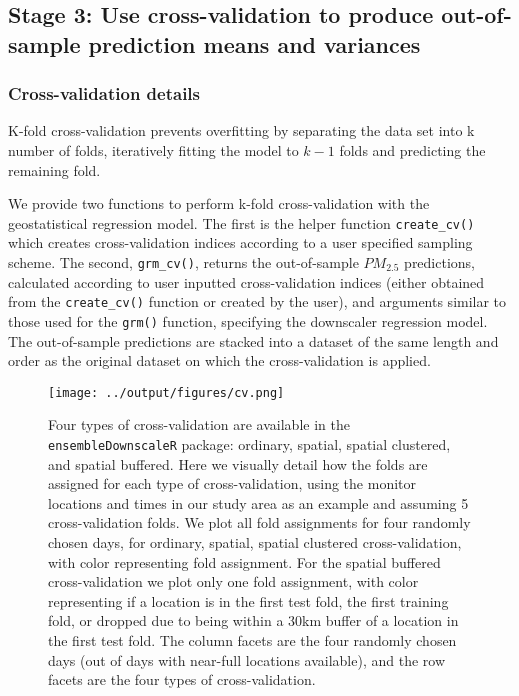 \documentclass[12pt]{article}
\begin{document}
\subsection*{Stage 3: Use cross-validation to produce out-of-sample prediction means and variances}

\subsubsection*{Cross-validation details}

K-fold cross-validation prevents overfitting by separating the data set into k number of folds, iteratively fitting the model to $k-1$ folds and predicting the remaining fold.

We provide two functions to perform k-fold cross-validation with the geostatistical regression model. 
The first is the helper function \texttt{create\_cv()} which creates cross-validation indices according to a user specified sampling scheme. 
The second, \texttt{grm\_cv()}, returns the out-of-sample $PM_{2.5}$ predictions, calculated according to user inputted cross-validation indices (either obtained from the \texttt{create\_cv()} function or created by the user), and arguments similar to those used for the \texttt{grm()} function, specifying the downscaler regression model. 
The out-of-sample predictions are stacked into a dataset of the same length and order as the original dataset on which the cross-validation is applied.

\begin{figure}[ht]
    \centering
    \texttt{[image: ../output/figures/cv.png]}
    \caption{Four types of cross-validation are available in the \texttt{ensembleDownscaleR} package: ordinary, spatial, spatial clustered, and spatial buffered.
    Here we visually detail how the folds are assigned for each type of cross-validation, using the monitor locations and times in our study area as an example and assuming 5 cross-validation folds. 
    We plot all fold assignments for four randomly chosen days, for ordinary, spatial, spatial clustered cross-validation, with color representing fold assignment.
    For the spatial buffered cross-validation we plot only one fold assignment, with color representing if a location is in the first test fold, the first training fold, or dropped due to being within a 30km buffer of a location in the first test fold.
    The column facets are the four randomly chosen days (out of days with near-full locations available), and the row facets are the four types of cross-validation.}
    \label{fig:cvtypes}
\end{figure}
\end{document}
